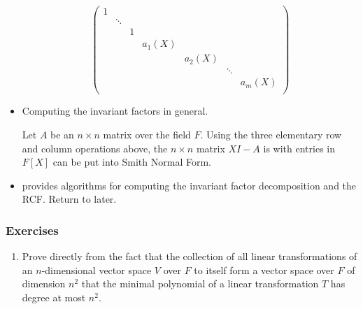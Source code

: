\documentclass[../notes.tex]{subfiles}
\begin{document}
\begin{itemize}
    \begin{equation*}
        \begin{pmatrix}
            1\\
            & \ddots\\
            && 1\\
            &&& a_1(X)\\
            &&&& a_2(X)\\
            &&&&& \ddots\\
            &&&&&& a_m(X)\\
        \end{pmatrix}
    \end{equation*}
    \item Computing the invariant factors in general.
    \begin{theorem}\label{trm:12.21}
        Let $A$ be an $n\times n$ matrix over the field $F$. Using the three elementary row and column operations above, the $n\times n$ matrix $XI-A$ is with entries in $F[X]$ can be put into Smith Normal Form.
    \end{theorem}
    \item \textcite{bib:DummitFoote} provides algorithms for computing the invariant factor decomposition and the RCF. Return to later.
\end{itemize}

\subsubsection*{Exercises}
\begin{enumerate}[label={\textbf{\arabic*.}},ref={12.2.\arabic*},start=5]
    \item \label{exr:12.2.5}Prove directly from the fact that the collection of all linear transformations of an $n$-dimensional vector space $V$ over $F$ to itself form a vector space over $F$ of dimension $n^2$ that the minimal polynomial of a linear transformation $T$ has degree at most $n^2$.
\end{enumerate}
\end{document}
